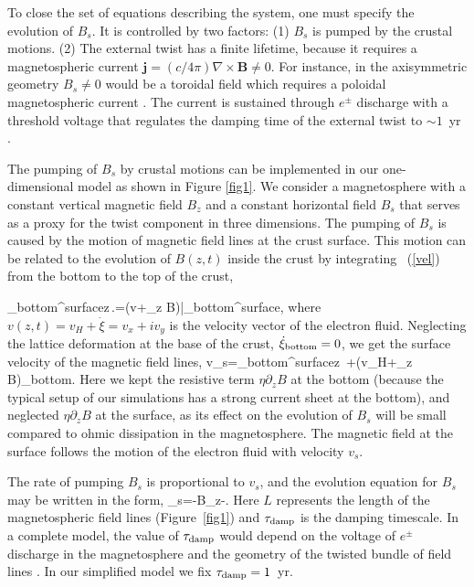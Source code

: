 To close the set of equations describing the system, one must specify the evolution of $B_s$. 
It is controlled by two factors: 
(1) $B_s$ is pumped by the crustal motions.
(2) The external twist has a finite lifetime, because it requires a magnetospheric current ${\mathbf j}=(c/4\pi)\nabla\times{\mathbf B}\neq 0$. 
For instance, in the axisymmetric geometry $B_s\neq 0$ would be a toroidal field which requires a poloidal magnetospheric current \citep{2002ApJ...574..332T}. 
The current is sustained through $e^\pm$ discharge with a threshold voltage that regulates the damping time of the external twist to $\sim 1$~yr \citep{2007ApJ...657..967B}.

The pumping of $B_s$ by crustal motions can be implemented in our one-dimensional model as shown in Figure \ref{fig1}.
We consider a magnetosphere with a constant vertical magnetic field $B_z$ and a constant horizontal field $B_s$ that serves as a proxy for the twist component in three dimensions.
The pumping of $B_s$ is caused by the motion of magnetic field lines at the crust surface. 
This motion can be related to the evolution of $B(z,t)$ inside the crust by integrating \Eq~(\ref{vel}) from the bottom to the top of the crust,

\beq
\int\limits_{\rm bottom}^{\rm surface}\md z\,\left.=(v+\eta\partial_z B)\right|_{\rm bottom}^{\rm surface},
\eeq
where $v(z,t)=v_H+\dot{\xi}=v_x+iv_y$ is the velocity vector of the electron fluid. 
Neglecting the lattice deformation at the base of the crust, 
$\dot{\xi}_{\rm bottom}=0$, we get the surface velocity of the magnetic field lines,
\beq
v_s=\int\limits_{\rm bottom}^{\rm surface}\md z\,
+\left(v_H+\eta\partial_z B\right)_{\rm bottom}.
\label{vsurf}
\eeq
Here we kept the resistive term $\eta\partial_z B$ at the bottom (because the typical setup of our simulations has a strong current sheet at the bottom), and neglected $\eta\partial_z B$ at the surface, as its effect on the evolution of $B_s$ will be small compared to ohmic dissipation in the magnetosphere.
The magnetic field at the surface follows the motion of the electron fluid with velocity $v_s$.

The rate of pumping $B_s$ is proportional to $v_s$, and the evolution equation for $B_s$ may be written in the form,
\beq\label{bs}
_s=-B_z-.
\eeq
Here $L$ represents the length of the magnetospheric field lines (Figure~\ref{fig1}) and $\tau_{\rm damp}$ is the damping timescale. 
In a complete model, the value of $\tau_{\rm damp}$ would depend on the voltage of $e^\pm$ discharge in the magnetosphere and the geometry of the twisted bundle of field lines \citep{2009ApJ...703.1044B}.  
In our simplified model we fix $\tau_{\rm damp}=1$~yr.

